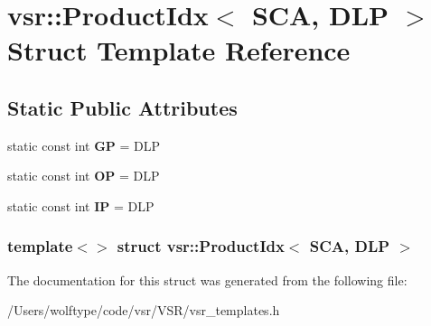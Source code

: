 \hypertarget{structvsr_1_1_product_idx_3_01_s_c_a_00_01_d_l_p_01_4}{\section{vsr\-:\-:Product\-Idx$<$ S\-C\-A, D\-L\-P $>$ Struct Template Reference}
\label{structvsr_1_1_product_idx_3_01_s_c_a_00_01_d_l_p_01_4}
}
\subsection*{Static Public Attributes}
\begin{DoxyCompactItemize}
\item 
\hypertarget{structvsr_1_1_product_idx_3_01_s_c_a_00_01_d_l_p_01_4_a4688b48021126a68f5a69d8381480207}{static const int {\bfseries G\-P} = D\-L\-P}\label{structvsr_1_1_product_idx_3_01_s_c_a_00_01_d_l_p_01_4_a4688b48021126a68f5a69d8381480207}

\item 
\hypertarget{structvsr_1_1_product_idx_3_01_s_c_a_00_01_d_l_p_01_4_acb751bca9400f88e50bc12c8bfcaff74}{static const int {\bfseries O\-P} = D\-L\-P}\label{structvsr_1_1_product_idx_3_01_s_c_a_00_01_d_l_p_01_4_acb751bca9400f88e50bc12c8bfcaff74}

\item 
\hypertarget{structvsr_1_1_product_idx_3_01_s_c_a_00_01_d_l_p_01_4_adfeaa75a3525087d69bd88a73cacf012}{static const int {\bfseries I\-P} = D\-L\-P}\label{structvsr_1_1_product_idx_3_01_s_c_a_00_01_d_l_p_01_4_adfeaa75a3525087d69bd88a73cacf012}

\end{DoxyCompactItemize}
\subsubsection*{template$<$$>$ struct vsr\-::\-Product\-Idx$<$ S\-C\-A, D\-L\-P $>$}



The documentation for this struct was generated from the following file\-:\begin{DoxyCompactItemize}
\item 
/\-Users/wolftype/code/vsr/\-V\-S\-R/vsr\-\_\-templates.\-h\end{DoxyCompactItemize}
